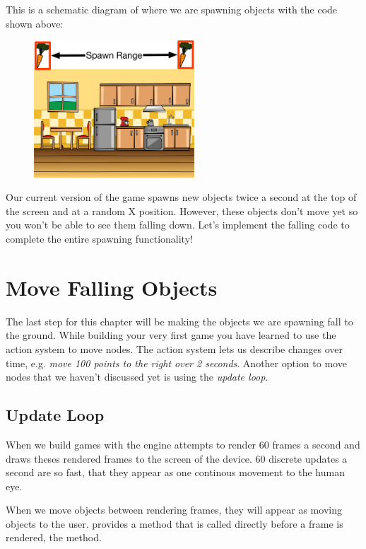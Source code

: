 This is a schematic diagram of where we are spawning
objects with the code shown above:

\begin{figure}[H]
		\centering
		\includegraphics[width=170pt]{images/Chapter2/SpawnObjects.png}
\end{figure}

Our current version of the game spawns new objects twice a second at the top of
the screen and at a random X position. However, these objects don't move yet so
you won't be able to see them falling down. Let's implement the falling code to
complete the entire spawning functionality!

\section{Move Falling Objects}
The last step for this chapter will be making the objects we are spawning fall
to the ground. While building your very first \SB{} game you have learned to use
the \cocos{} action system to move nodes. The action system lets us describe changes over time, e.g. \textit{move 100 points to the right over 2
seconds}. Another option to move nodes that we haven't
discussed yet is using the \cocos{} \textit{update loop}.

\subsection{Update Loop}
When we build games with \cocos{} the engine attempts to render 60 frames a
second and draws theses rendered frames to the screen of the device. 60 discrete
updates a second are so fast, that they appear as one continous movement to the
human eye. 

When we move objects between rendering frames, they will appear as
moving objects to the user. \cocos{} provides a method that is called directly before a frame is rendered, the  method.

